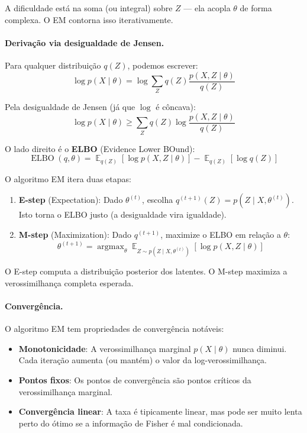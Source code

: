 \documentclass{tufte-handout}
\DeclareMathOperator*{\argmax}{argmax}
\DeclareMathOperator{\E}{\mathbb{E}}
\DeclareMathOperator{\ELBO}{ELBO}
\begin{document}
A dificuldade está na soma (ou integral) sobre $Z$ --- ela acopla $\theta$ de forma complexa. O EM contorna isso iterativamente.

\paragraph{Derivação via desigualdade de Jensen.}

Para qualquer distribuição $q(Z)$, podemos escrever:
\[
\log p(X \mid \theta) = \log \sum_Z q(Z) \frac{p(X, Z \mid \theta)}{q(Z)}
\]

Pela desigualdade de Jensen (já que $\log$ é côncava):
\[
\log p(X \mid \theta) \ge \sum_Z q(Z) \log \frac{p(X, Z \mid \theta)}{q(Z)}
\]

O lado direito é o \textbf{ELBO} (Evidence Lower BOund):
\[
\ELBO(q, \theta) = \E_{q(Z)}[\log p(X, Z \mid \theta)] - \E_{q(Z)}[\log q(Z)]
\]

\begin{defn}[Algoritmo EM]
    O algoritmo EM itera duas etapas:
    \begin{enumerate}
        \item \textbf{E-step} (Expectation): Dado $\theta^{(t)}$, escolha $q^{(t+1)}(Z) = p(Z \mid X, \theta^{(t)})$. Isto torna o ELBO justo (a desigualdade vira igualdade).
        \item \textbf{M-step} (Maximization): Dado $q^{(t+1)}$, maximize o ELBO em relação a $\theta$:
        \[
        \theta^{(t+1)} = \argmax_\theta \E_{Z \sim p(Z \mid X, \theta^{(t)})}[\log p(X, Z \mid \theta)]
        \]
    \end{enumerate}
\end{defn}

O E-step computa a distribuição posterior dos latentes. O M-step maximiza a verossimilhança completa esperada.

\paragraph{Convergência.}

O algoritmo EM tem propriedades de convergência notáveis:
\begin{itemize}
    \item \textbf{Monotonicidade}: A verossimilhança marginal $p(X \mid \theta)$ nunca diminui. Cada iteração aumenta (ou mantém) o valor da log-verossimilhança.
    \item \textbf{Pontos fixos}: Os pontos de convergência são pontos críticos da verossimilhança marginal.
    \item \textbf{Convergência linear}: A taxa é tipicamente linear, mas pode ser muito lenta perto do ótimo se a informação de Fisher é mal condicionada.
\end{itemize}
\end{document}
